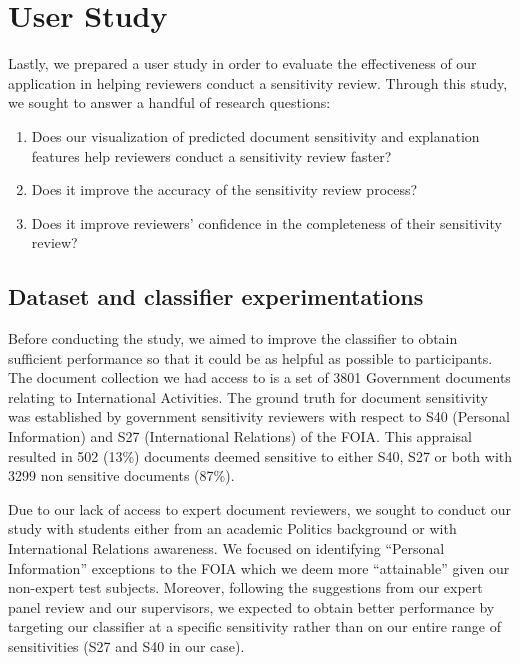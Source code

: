 \documentclass[\version]{l4proj}
\begin{document}
\section{User Study}

Lastly, we prepared a user study in order to evaluate the effectiveness of our application in helping reviewers conduct a sensitivity review.
Through this study, we sought to answer a handful of research questions:

\begin{enumerate}[label=\textbf{RQ\arabic*}]
    \item Does our visualization of predicted document sensitivity and explanation features help reviewers conduct a sensitivity review faster?
    \item Does it improve the accuracy of the sensitivity review process?
    \item Does it improve reviewers' confidence in the completeness of their sensitivity review?
\end{enumerate}

\subsection{Dataset and classifier experimentations}

Before conducting the study, we aimed to improve the classifier to obtain sufficient performance so that it could be as helpful as possible to participants.
The document collection we had access to is a set of 3801 Government documents relating to International Activities.
The ground truth for document sensitivity was established by government sensitivity reviewers with respect to S40 (Personal Information) and S27 (International Relations) of the FOIA.
This appraisal resulted in 502 (13\%) documents deemed sensitive to either S40, S27 or both with 3299 non sensitive documents (87\%).

Due to our lack of access to expert document reviewers, we sought to conduct our study with students either from an academic Politics background or with International Relations awareness.
We focused on identifying ``Personal Information'' exceptions to the FOIA which we deem more ``attainable'' given our non-expert test subjects.
Moreover, following the suggestions from our expert panel review and our supervisors, we expected to obtain better performance by targeting our classifier at a specific sensitivity rather than on our entire range of sensitivities (S27 and S40 in our case).
\end{document}
